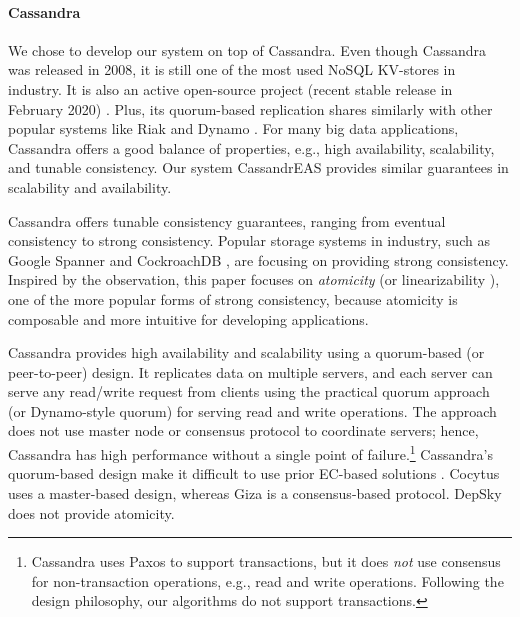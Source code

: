 \paragraph*{Cassandra}

We chose to develop our system on top of Cassandra. Even though Cassandra was released in 2008, it is still one of the most used NoSQL KV-stores in industry. It is also an active open-source project (recent stable release in February 2020) \cite{DBEnginesCassandra}. Plus, its quorum-based replication \cite{pbs-vldb2012} shares similarly with other popular systems like Riak \cite{Riak} and Dynamo \cite{Dynamo}. For many big data applications, Cassandra offers a good balance of properties, e.g., high availability, scalability, and tunable consistency. Our system CassandrEAS provides similar guarantees in scalability and availability.%


Cassandra offers tunable consistency guarantees, ranging from eventual consistency to strong consistency.
Popular storage systems in industry, such as Google Spanner \cite{Spanner} and CockroachDB \cite{cockroachDB}, are focusing on providing strong consistency. 
Inspired by the observation, this paper focuses on \textit{atomicity} \cite{lamport} (or linearizability \cite{herlihy1990linearizability}), one of the more popular forms of strong consistency, because atomicity is composable \cite{herlihy1990linearizability} and more intuitive for developing applications.


Cassandra provides high availability and scalability using a quorum-based (or peer-to-peer) design.
It replicates data on multiple servers, and each server can serve any read/write request from clients 
using the practical quorum approach (or Dynamo-style quorum) \cite{pbs-vldb2012} for serving read and write operations. 
The approach does not use master node or consensus protocol to coordinate servers; hence, Cassandra has high performance without a single point of failure.\footnote{Cassandra uses Paxos \cite{paxos} to support transactions, but it does \textit{not} use consensus for non-transaction operations, e.g., read and write operations. Following the design philosophy, our algorithms do not support transactions.}  
Cassandra's quorum-based design make it difficult to use prior EC-based solutions \cite{Cocytus2016,GIZA2017,DepSky13}. Cocytus \cite{Cocytus2016} uses a master-based design, whereas Giza \cite{GIZA2017} is a consensus-based protocol. DepSky  \cite{DepSky13} does not provide atomicity. 

